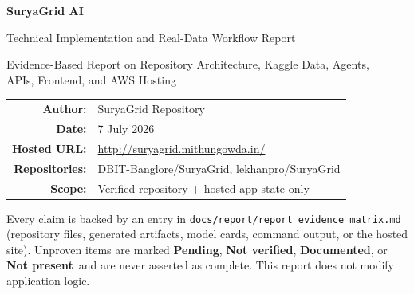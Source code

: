 \documentclass[11pt,a4paper]{article}
\newcommand{\stPend}{\textcolor{cpart}{\textbf{Pending}}}
\newcommand{\stDoc}{\textcolor{cpart}{\textbf{Documented}}}
\newcommand{\stNP}{\textcolor{cmiss}{\textbf{Not present}}}
\newcommand{\stNV}{\textcolor{cnv}{\textbf{Not verified}}}
\newcommand{\code}[1]{\texttt{\small #1}}
\begin{document}
\begin{titlepage}
\centering
\vspace*{2cm}
{\Huge\bfseries SuryaGrid AI\par}
\vspace{0.5cm}
{\LARGE Technical Implementation and Real-Data Workflow Report\par}
\vspace{0.7cm}
{\large Evidence-Based Report on Repository Architecture, Kaggle Data, Agents,\\
APIs, Frontend, and AWS Hosting\par}
\vspace{1.6cm}
\begin{tabular}{rl}
\textbf{Author:} & SuryaGrid Repository\\[3pt]
\textbf{Date:} & 7 July 2026\\[3pt]
\textbf{Hosted URL:} & \url{http://suryagrid.mithungowda.in/}\\[3pt]
\textbf{Repositories:} & DBIT-Banglore/SuryaGrid, lekhanpro/SuryaGrid\\[3pt]
\textbf{Scope:} & Verified repository + hosted-app state only\\
\end{tabular}
\vfill
{\footnotesize Every claim is backed by an entry in \code{docs/report/report\_evidence\_matrix.md}
(repository files, generated artifacts, model cards, command output, or the hosted site).
Unproven items are marked \stPend, \stNV, \stDoc, or \stNP\ and are never asserted as
complete. This report does not modify application logic.\par}
\end{titlepage}

\tableofcontents
\newpage

\end{document}
